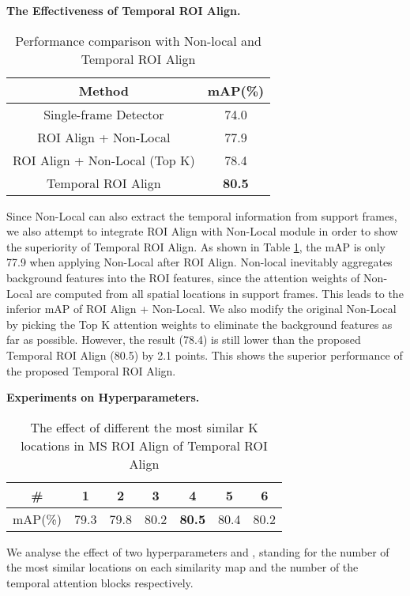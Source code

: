 \documentclass[letterpaper]{article} \usepackage{aaai21}  \usepackage{times}  \usepackage{helvet} \usepackage{courier}  \usepackage[hyphens]{url}  \usepackage{graphicx} \usepackage{hyperref}
\begin{document}
\noindent\textbf{The Effectiveness of Temporal ROI Align.}
\begin{table}[t]
\begin{center}
\begin{tabular}{c|c}
  \hline
  \hline
  Method & mAP(\%) \\
  \hline
  \hline
  Single-frame Detector & 74.0 \\
  \hline
  ROI Align + Non-Local & 77.9 \\
  ROI Align + Non-Local (Top K) & 78.4 \\
  Temporal ROI Align & \textbf{80.5}\\
  \hline
  \hline
\end{tabular}
\end{center}
\vspace{-0.2cm}
\caption{Performance comparison with Non-local and Temporal ROI Align}
\label{t:non-local}
\vspace{-0.2cm}
\end{table}
Since Non-Local \cite{wang2018non} can also extract the temporal information from support frames, we also attempt to integrate ROI Align with Non-Local  module in order to show the superiority of Temporal ROI Align.  As shown in Table \ref{t:non-local}, the mAP is only 77.9 when applying Non-Local after ROI Align. Non-local inevitably aggregates background features into the ROI features, since the attention weights of Non-Local are computed from all spatial locations in  support frames. This leads to the inferior mAP of ROI Align + Non-Local. We also modify the original Non-Local by picking the Top K attention weights to eliminate the background features as far as possible. However, the result (78.4) is still lower than the proposed Temporal ROI Align (80.5) by 2.1 points. This shows the superior performance of the proposed Temporal ROI Align.

\noindent\textbf{Experiments on Hyperparameters.}
\begin{table}[t]
\begin{center}
\begin{tabular}{c|c|c|c|c|c|c}
  \hline
  \hline
  \# & 1 & 2 & 3 & 4 & 5 & 6\\
  \hline
  mAP(\%) &79.3 & 79.8 & 80.2 & \textbf{80.5} & 80.4 & 80.2\\
  \hline
  \hline
\end{tabular}
\end{center}
\vspace{-0.2cm}
\caption{The effect of different the most similar K locations in MS ROI Align of Temporal ROI Align}
\label{t:topk}
\end{table}
We analyse the effect of two hyperparameters  and , standing for the number of the most similar locations on each similarity map and the number of the temporal attention blocks respectively.
\end{document}
